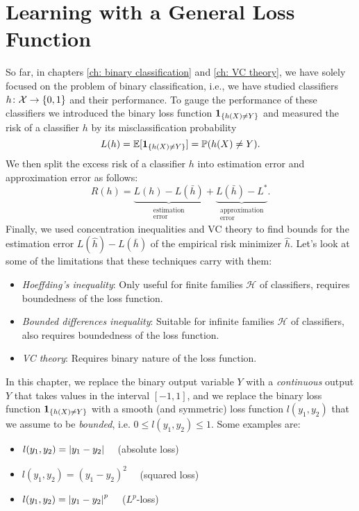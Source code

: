 \chapter{Learning with a General Loss Function}

So far, in chapters \ref{ch: binary classification} and \ref{ch: VC theory}, we have solely focused on the problem of binary classification, i.e., we have studied classifiers $h \colon \mathcal{X} \to \set{0, 1}$ and their performance. To gauge the performance of these classifiers we introduced the binary loss function $\indSet{h(X) \neq Y}$ and measured the risk of a classifier $h$ by its misclassification probability
\[
    L(h) = \Exp[\indSet{h(X) \neq Y}] = \Prob(h(X) \neq Y).
\]
We then split the excess risk of a classifier $h$ into estimation error and approximation error as follows:
\[
    R(h) = \underbrace{L(h) - L(\bar{h})}_{\substack{\text{estimation} \\ \text{error}}} + \underbrace{L(\bar{h}) - L^*}_{\substack{\text{approximation} \\ \text{error}}}.
\]
Finally, we used concentration inequalities and VC theory to find bounds for the estimation error $L(\hat{h}) - L(\bar{h})$ of the empirical risk minimizer $\hat{h}$. Let's look at some of the limitations that these techniques carry with them:

\begin{itemize}
    \item \emph{Hoeffding's inequality}: Only useful for finite families $\mathcal{H}$ of classifiers, requires boundedness of the loss function.

    \item \emph{Bounded differences inequality}: Suitable for infinite families $\mathcal{H}$ of classifiers, also requires boundedness of the loss function.

    \item \emph{VC theory}: Requires binary nature of the loss function.
\end{itemize}

In this chapter, we replace the binary output variable $Y$ with a \emph{continuous} output $Y$ that takes values in the interval $[-1, 1]$, and we replace the binary loss function $\indSet{h(X) \neq Y}$ with a smooth (and symmetric) loss function $l(y_1, y_2)$ that we assume to be \emph{bounded}, i.e. $0 \leq l(y_1, y_2) \leq 1$. Some examples are:

\begin{itemize}
    \item $l(y_1, y_2) = \abs{y_1 - y_2} \quad$ (absolute loss)
    
    \item $l(y_1, y_2) = (y_1 - y_2)^2 \quad$ (squared loss)

    \item $l(y_1, y_2) = \abs{y_1 - y_2}^p \quad$ ($L^p$-loss)
\end{itemize}


